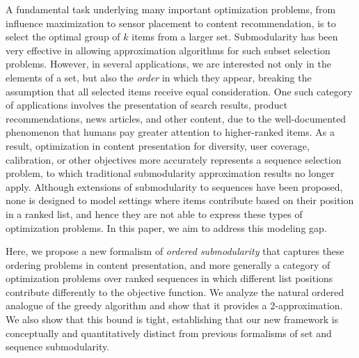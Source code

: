 

%
A fundamental task underlying many important optimization problems, from influence maximization to sensor placement to content recommendation, is to select the optimal group of $k$ items from a larger set. Submodularity has been very effective in allowing approximation algorithms for such subset selection problems. However, in several applications, we are interested not only in the elements of a set, but also the \emph{order} in which they appear, breaking the assumption that all selected items receive equal consideration. One such category of applications involves the presentation of search results, product recommendations, news articles, and other content, due to the well-documented phenomenon that humans pay greater attention to higher-ranked items. As a result, optimization in content presentation for diversity, user coverage, calibration, or other objectives more accurately represents a sequence selection problem, to which traditional submodularity approximation results no longer apply. Although extensions of submodularity to sequences have been proposed, none is designed to model settings where items contribute based on their position in a ranked list, and hence they are not able to express these types of optimization problems. In this paper, we aim to address this modeling gap.

Here, we propose a new formalism of \emph{ordered submodularity} that captures these ordering problems in content presentation, and more generally a category of optimization problems over ranked sequences in which different list positions contribute differently to the objective function. We analyze the natural ordered analogue of the greedy algorithm and show that it provides a $2$-approximation. We also show that this bound is tight, establishing that our new framework is conceptually and quantitatively distinct from previous formalisms of set and sequence submodularity.


%